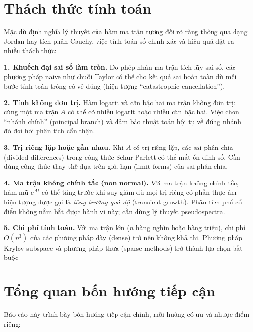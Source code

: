 \documentclass[12pt,a4paper]{report}
\begin{document}
\section*{Thách thức tính toán}

Mặc dù định nghĩa lý thuyết của hàm ma trận tương đối rõ ràng thông qua dạng Jordan
hay tích phân Cauchy, việc tính toán số chính xác và hiệu quả đặt ra nhiều thách thức:

\textbf{1. Khuếch đại sai số làm tròn.} Do phép nhân ma trận tích lũy sai số,
các phương pháp naive như chuỗi Taylor có thể cho kết quả sai hoàn toàn dù mỗi
bước tính toán trông có vẻ đúng (hiện tượng ``catastrophic cancellation'').

\textbf{2. Tính không đơn trị.} Hàm logarit và căn bậc hai ma trận không đơn trị:
cùng một ma trận $A$ có thể có nhiều logarit hoặc nhiều căn bậc hai. Việc chọn
``nhánh chính'' (principal branch) và đảm bảo thuật toán hội tụ về đúng nhánh đó
đòi hỏi phân tích cẩn thận.

\textbf{3. Trị riêng lặp hoặc gần nhau.} Khi $A$ có trị riêng lặp, các sai phân
chia (divided differences) trong công thức Schur-Parlett có thể mất ổn định số.
Cần dùng công thức thay thế dựa trên giới hạn (limit forms) của sai phân chia.

\textbf{4. Ma trận không chính tắc (non-normal).} Với ma trận không chính tắc,
hàm mũ $e^{At}$ có thể tăng trước khi suy giảm dù mọi trị riêng có phần thực âm
--- hiện tượng được gọi là \emph{tăng trưởng quá độ} (transient growth). Phân tích
phổ cổ điển không nắm bắt được hành vi này; cần dùng lý thuyết pseudospectra.

\textbf{5. Chi phí tính toán.} Với ma trận lớn ($n$ hàng nghìn hoặc hàng triệu),
chi phí $O(n^3)$ của các phương pháp dày (dense) trở nên không khả thi. Phương
pháp Krylov subspace và phương pháp thưa (sparse methods) trở thành lựa chọn bắt buộc.

\section*{Tổng quan bốn hướng tiếp cận}

Báo cáo này trình bày bốn hướng tiếp cận chính, mỗi hướng có ưu và nhược điểm riêng:
\end{document}
